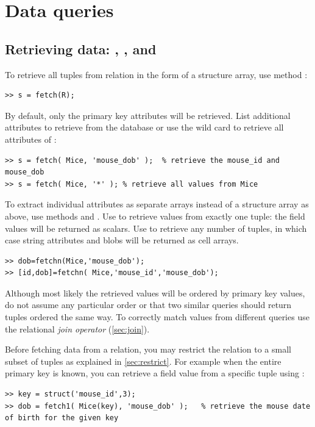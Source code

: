 \documentclass[10pt]{article}
\begin{document}
\newpage\section{Data queries}

\subsection{Retrieving data:  , , and }\label{sec:fetch}

To retrieve all tuples from relation  in the form of a structure array, use method :
\begin{lstlisting}
>> s = fetch(R);
\end{lstlisting}

By default, only the primary key attributes will be retrieved.  List additional attributes to retrieve from the database or use the wild card   to retrieve all attributes of :
\begin{lstlisting}
>> s = fetch( Mice, 'mouse_dob' );  % retrieve the mouse_id and mouse_dob
>> s = fetch( Mice, '*' ); % retrieve all values from Mice
\end{lstlisting}

To extract individual attributes as separate arrays instead of a structure array as above, use methods  and .  Use  to retrieve values from exactly one tuple: the field values will be returned as scalars.  Use  to retrieve any number of tuples, in which case string attributes and blobs will be returned as cell arrays.
\begin{lstlisting}
>> dob=fetchn(Mice,'mouse_dob');
>> [id,dob]=fetchn( Mice,'mouse_id','mouse_dob');
\end{lstlisting}

Although most likely the retrieved values will be ordered by primary key values, do not assume any particular order or that two similar queries should return tuples ordered the same way.  To correctly match values from different queries use the relational \emph{join operator} (\autoref{sec:join}).

Before fetching data from a relation, you may restrict the relation to a small subset of tuples as explained in \autoref{sec:restrict}. For example when the entire primary key is known, you can retrieve a field value from a specific tuple using :
\begin{lstlisting}
>> key = struct('mouse_id',3);
>> dob = fetch1( Mice(key), 'mouse_dob' );   % retrieve the mouse date of birth for the given key 
\end{lstlisting}
\end{document}
